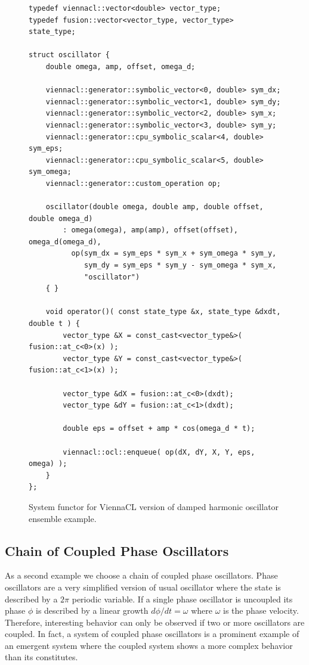 \documentclass[1p]{elsarticle}
\begin{document}
\begin{figure}[p]
\begin{lstlisting}
typedef viennacl::vector<double> vector_type;
typedef fusion::vector<vector_type, vector_type> state_type;

struct oscillator {
    double omega, amp, offset, omega_d;

    viennacl::generator::symbolic_vector<0, double> sym_dx;
    viennacl::generator::symbolic_vector<1, double> sym_dy;
    viennacl::generator::symbolic_vector<2, double> sym_x;
    viennacl::generator::symbolic_vector<3, double> sym_y;
    viennacl::generator::cpu_symbolic_scalar<4, double> sym_eps;
    viennacl::generator::cpu_symbolic_scalar<5, double> sym_omega;
    viennacl::generator::custom_operation op;

    oscillator(double omega, double amp, double offset, double omega_d)
        : omega(omega), amp(amp), offset(offset), omega_d(omega_d),
          op(sym_dx = sym_eps * sym_x + sym_omega * sym_y,
             sym_dy = sym_eps * sym_y - sym_omega * sym_x,
             "oscillator")
    { }

    void operator()( const state_type &x, state_type &dxdt, double t ) {
        vector_type &X = const_cast<vector_type&>( fusion::at_c<0>(x) );
        vector_type &Y = const_cast<vector_type&>( fusion::at_c<1>(x) );

        vector_type &dX = fusion::at_c<0>(dxdt);
        vector_type &dY = fusion::at_c<1>(dxdt);

        double eps = offset + amp * cos(omega_d * t);

        viennacl::ocl::enqueue( op(dX, dY, X, Y, eps, omega) );
    }
};
\end{lstlisting}
\caption{System functor for ViennaCL version of damped harmonic oscillator
ensemble example.}
\label{code:viennacl:damped}
\end{figure}

\subsection{Chain of Coupled Phase Oscillators}

As a second example we choose a chain of coupled phase oscillators. Phase
oscillators are a very simplified version of usual oscillator where the state
is described by a $2\pi$ periodic variable. If a single phase oscillator is
uncoupled its phase $\phi$ is described by a linear growth $d\phi/dt = \omega$
where $\omega$ is the phase velocity. Therefore, interesting behavior can only
be observed if two or more oscillators are coupled. In fact, a system of
coupled phase oscillators is a prominent example of an emergent system where
the coupled system shows a more complex behavior than its constitutes.
\end{document}
